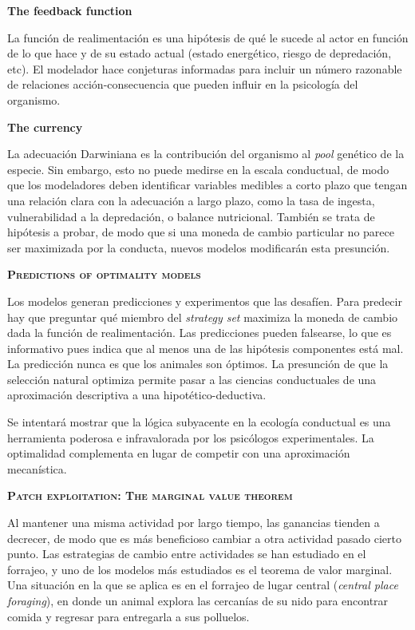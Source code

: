 \documentclass[a4paper,12pt]{article}
\begin{document}
{\bfseries The feedback function}

La función de realimentación es una hipótesis de qué le sucede al actor en función de lo que hace y de su estado actual (estado energético, riesgo de depredación, etc). El modelador hace conjeturas informadas para incluir un número razonable de relaciones acción-consecuencia que pueden influir en la psicología del organismo.

{\bfseries The currency}

La adecuación Darwiniana es la contribución del organismo al {\itshape pool} genético de la especie. Sin embargo, esto no puede medirse en la escala conductual, de modo que los modeladores deben identificar variables medibles a corto plazo que tengan una relación clara con la adecuación a largo plazo, como la tasa de ingesta, vulnerabilidad a la depredación, o balance nutricional. También se trata de hipótesis a probar, de modo que si una moneda de cambio particular no parece ser maximizada por la conducta, nuevos modelos modificarán esta presunción.

{\scshape\bfseries Predictions of optimality models}

Los modelos generan predicciones y experimentos que las desafíen. Para predecir hay que preguntar qué miembro del {\itshape strategy set} maximiza la moneda de cambio dada la función de realimentación. Las predicciones pueden falsearse, lo que es informativo pues indica que al menos una de las hipótesis componentes está mal. La predicción nunca es que los animales son óptimos. La presunción de que la selección natural optimiza permite pasar a las ciencias conductuales de una aproximación descriptiva a una hipotético-deductiva.

Se intentará mostrar que la lógica subyacente en la ecología conductual es una herramienta poderosa e infravalorada por los psicólogos experimentales. La optimalidad complementa en lugar de competir con una aproximación mecanística.

{\scshape\bfseries Patch exploitation: The marginal value theorem}

Al mantener una misma actividad por largo tiempo, las ganancias tienden a decrecer, de modo que es más beneficioso cambiar a otra actividad pasado cierto punto. Las estrategias de cambio entre actividades se han estudiado en el forrajeo, y uno de los modelos más estudiados es el teorema de valor marginal. Una situación en la que se aplica es en el forrajeo de lugar central ({\itshape central place foraging}), en donde un animal explora las cercanías de su nido para encontrar comida y regresar para entregarla a sus polluelos.
\end{document}
